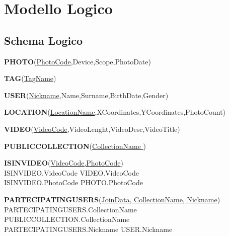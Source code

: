\chapter{Modello Logico}


\section{Schema Logico}
\vspace{2em}

\textbf{PHOTO}(\underline{Photo\textunderscore Code},Device,Scope,Photo\textunderscore Date)\\

\bigskip

\textbf{TAG}(\underline{Tag\textunderscore Name})\\

\bigskip

\textbf{USER}(\underline{Nickname},Name,Surname,BirthDate,Gender)\\

\bigskip

\textbf{LOCATION}(\underline{Location\textunderscore Name},X\textunderscore Coordinates,Y\textunderscore Coordinates,Photo\textunderscore Count)\\

\bigskip

\textbf{VIDEO}(\underline{Video\textunderscore Code},Video\textunderscore Lenght,Video\textunderscore Desc,Video\textunderscore Title)\\

\bigskip

\textbf{PUBLIC\textunderscore COLLECTION}(\underline{Collection\textunderscore Name })\\

\bigskip

\textbf{IS\textunderscore IN\textunderscore VIDEO}(\underline{Video\textunderscore Code,Photo\textunderscore Code})\\
IS\textunderscore IN\textunderscore VIDEO.Video\textunderscore Code \leftarrow VIDEO.Video\textunderscore Code\\
IS\textunderscore IN\textunderscore VIDEO.Photo\textunderscore Code \leftarrow PHOTO.Photo\textunderscore Code\\

\bigskip

\textbf{PARTECIPATING\textunderscore USERS}(\underline{Join\textunderscore Data, Collection\textunderscore Name, Nickname})\\
PARTECIPATING\textunderscore USERS.Collection\textunderscore Name \leftarrow PUBLIC\textunderscore COLLECTION.Collection\textunderscore Name\\
PARTECIPATING\textunderscore USERS.Nickname \leftarrow USER.Nickname\\

